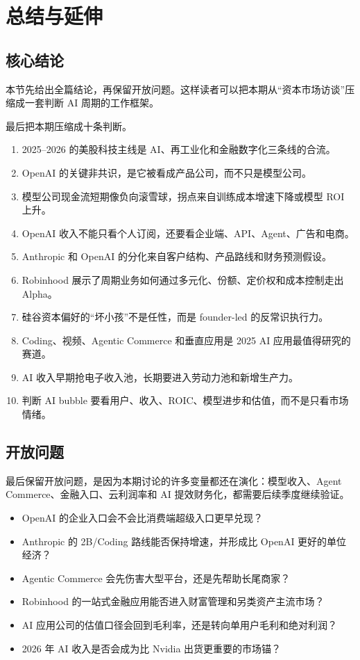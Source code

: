 \section{总结与延伸}

\subsection{核心结论}

本节先给出全篇结论，再保留开放问题。这样读者可以把本期从“资本市场访谈”压缩成一套判断 AI 周期的工作框架。

最后把本期压缩成十条判断。

\begin{enumerate}
\item 2025--2026 的美股科技主线是 AI、再工业化和金融数字化三条线的合流。
\item OpenAI 的关键非共识，是它被看成产品公司，而不只是模型公司。
\item 模型公司现金流短期像负向滚雪球，拐点来自训练成本增速下降或模型 ROI 上升。
\item OpenAI 收入不能只看个人订阅，还要看企业端、API、Agent、广告和电商。
\item Anthropic 和 OpenAI 的分化来自客户结构、产品路线和财务预测假设。
\item Robinhood 展示了周期业务如何通过多元化、份额、定价权和成本控制走出 Alpha。
\item 硅谷资本偏好的“坏小孩”不是任性，而是 founder-led 的反常识执行力。
\item Coding、视频、Agentic Commerce 和垂直应用是 2025 AI 应用最值得研究的赛道。
\item AI 收入早期抢电子收入池，长期要进入劳动力池和新增生产力。
\item 判断 AI bubble 要看用户、收入、ROIC、模型进步和估值，而不是只看市场情绪。
\end{enumerate}

\subsection{开放问题}

最后保留开放问题，是因为本期讨论的许多变量都还在演化：模型收入、Agent Commerce、金融入口、云利润率和 AI 提效财务化，都需要后续季度继续验证。

\begin{itemize}
\item OpenAI 的企业入口会不会比消费端超级入口更早兑现？
\item Anthropic 的 2B/Coding 路线能否保持增速，并形成比 OpenAI 更好的单位经济？
\item Agentic Commerce 会先伤害大型平台，还是先帮助长尾商家？
\item Robinhood 的一站式金融应用能否进入财富管理和另类资产主流市场？
\item AI 应用公司的估值口径会回到毛利率，还是转向单用户毛利和绝对利润？
\item 2026 年 AI 收入是否会成为比 Nvidia 出货更重要的市场锚？
\end{itemize}

